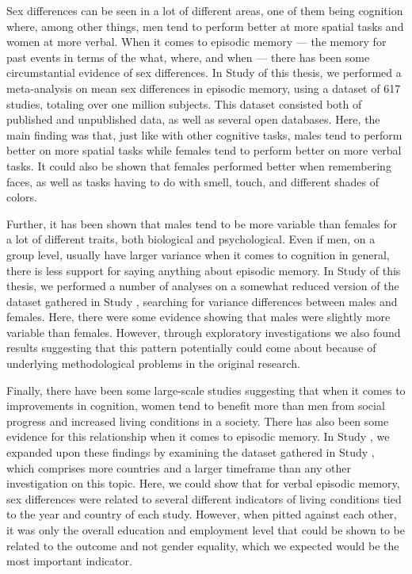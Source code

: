 ﻿\documentclass[12pt,twoside,]{article}
\begin{document}
Sex differences can be seen in a lot of different areas, one of them being cognition where, among other things, men tend to perform better at more spatial tasks and women at more verbal. When it comes to episodic memory --- the memory for past events in terms of the what, where, and when --- there has been some circumstantial evidence of sex differences. In Study  of this thesis, we performed a meta-analysis on mean sex differences in episodic memory, using a dataset of 617 studies, totaling over one million subjects. This dataset consisted both of published and unpublished data, as well as several open databases. Here, the main finding was that, just like with other cognitive tasks, males tend to perform better on more spatial tasks while females tend to perform better on more verbal tasks. It could also be shown that females performed better when remembering faces, as well as tasks having to do with smell, touch, and different shades of colors.

Further, it has been shown that males tend to be more variable than females for a lot of different traits, both biological and psychological. Even if men, on a group level, usually have larger variance when it comes to cognition in general, there is less support for saying anything about episodic memory. In Study  of this thesis, we performed a number of analyses on a somewhat reduced version of the dataset gathered in Study , searching for variance differences between males and females. Here, there were some evidence showing that males were slightly more variable than females. However, through exploratory investigations we also found results suggesting that this pattern potentially could come about because of underlying methodological problems in the original research.

Finally, there have been some large-scale studies suggesting that when it comes to improvements in cognition, women tend to benefit more than men from social progress and increased living conditions in a society. There has also been some evidence for this relationship when it comes to episodic memory. In Study , we expanded upon these findings by examining the dataset gathered in Study , which comprises more countries and a larger timeframe than any other investigation on this topic. Here, we could show that for verbal episodic memory, sex differences were related to several different indicators of living conditions tied to the year and country of each study. However, when pitted against each other, it was only the overall education and employment level that could be shown to be related to the outcome and not gender equality, which we expected would be the most important indicator.
\end{document}
